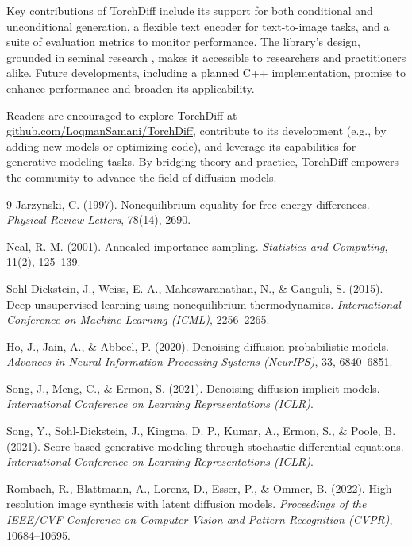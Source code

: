 \documentclass[12pt]{article}
\begin{document}
Key contributions of TorchDiff include its support for both conditional and unconditional generation, a flexible text encoder for text-to-image tasks, and a suite of evaluation metrics to monitor performance. The library’s design, grounded in seminal research \cite{sohl2015,ho2020,song2021,rombach2022}, makes it accessible to researchers and practitioners alike. Future developments, including a planned C++ implementation, promise to enhance performance and broaden its applicability.

Readers are encouraged to explore TorchDiff at \href{https://github.com/LoqmanSamani/TorchDiff}{github.com/LoqmanSamani/TorchDiff}, contribute to its development (e.g., by adding new models or optimizing code), and leverage its capabilities for generative modeling tasks. By bridging theory and practice, TorchDiff empowers the community to advance the field of diffusion models.


\newpage



\begin{thebibliography}{9}
Jarzynski, C. (1997). Nonequilibrium equality for free energy differences. \emph{Physical Review Letters}, 78(14), 2690.

Neal, R. M. (2001). Annealed importance sampling. \emph{Statistics and Computing}, 11(2), 125--139.

Sohl-Dickstein, J., Weiss, E. A., Maheswaranathan, N., \& Ganguli, S. (2015). Deep unsupervised learning using nonequilibrium thermodynamics. \emph{International Conference on Machine Learning (ICML)}, 2256--2265.

Ho, J., Jain, A., \& Abbeel, P. (2020). Denoising diffusion probabilistic models. \emph{Advances in Neural Information Processing Systems (NeurIPS)}, 33, 6840--6851.

Song, J., Meng, C., \& Ermon, S. (2021). Denoising diffusion implicit models. \emph{International Conference on Learning Representations (ICLR)}.

Song, Y., Sohl-Dickstein, J., Kingma, D. P., Kumar, A., Ermon, S., \& Poole, B. (2021). Score-based generative modeling through stochastic differential equations. \emph{International Conference on Learning Representations (ICLR)}.

Rombach, R., Blattmann, A., Lorenz, D., Esser, P., \& Ommer, B. (2022). High-resolution image synthesis with latent diffusion models. \emph{Proceedings of the IEEE/CVF Conference on Computer Vision and Pattern Recognition (CVPR)}, 10684--10695.
\end{thebibliography}
\end{document}
